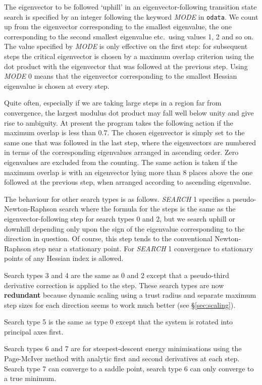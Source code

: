 \documentclass[12pt,a4paper,dvips]{article}
\begin{document}
The eigenvector to be followed `uphill'
in an eigenvector-following transition state search is specified by an integer following the keyword 
{\it MODE\/} in {\tt odata}.  We count up from the eigenvector corresponding to 
the smallest eigenvalue, the one corresponding to the second smallest eigenvalue 
etc.~using values 1, 2 and so on. The value specified by {\it MODE\/} is only
effective on the first step: for subsequent steps the critical eigenvector is 
chosen by a maximum overlap criterion using the dot product with the eigenvector 
that was followed at the previous step.  Using {\it MODE\/} 0 means that the 
eigenvector corresponding to the smallest Hessian eigenvalue is chosen at every step. 

Quite often, especially if we are taking large steps in a region far from convergence,
the largest modulus dot product may fall well below unity and give rise to ambiguity.
At present the program takes the following action if the maximum overlap is less than
0.7. The chosen eigenvector is simply set to the same one that was followed in the last
step, where the eigenvectors are numbered in terms of the corresponding eigenvalues arranged in
ascending order. Zero eigenvalues are excluded from the counting. The same action is
taken if the maximum overlap is with an eigenvector lying more than 8 places above
the one followed at the previous step, when arranged according to ascending eigenvalue.

The behaviour for other search types is as follows. {\it SEARCH\/} 1
specifies a pseudo-Newton-Raphson search where the formula for the steps is the same
as the eigenvector-following step for search types 0 and 2, but we search uphill or
downhill depending only upon the sign of the eigenvalue corresponding to the direction
in question.\cite{wales94a}
Of course, this step tends to the conventional Newton-Raphson step
near a stationary point. For {\it SEARCH\/} 1 convergence to stationary points of any Hessian 
index is allowed.

Search types 3 and 4 are the same as 0 and 2 except that a pseudo-third derivative
correction is applied to the step\cite{wales94a}. These search types are now {\bf redundant}
because dynamic scaling using a trust radius and separate maximum step sizes for each
direction seems to work much better (see \S\ref{sec:scaling}).

Search type 5 is the same as type 0 except that the system is rotated into principal
axes first.

Search types 6 and 7 are for steepest-descent energy minimisations using the Page-McIver
method\cite{pagem88} with analytic first and second derivatives at each step. 
Search type 7 can converge to a saddle point, search type 6 can only converge to a true minimum.
\end{document}
